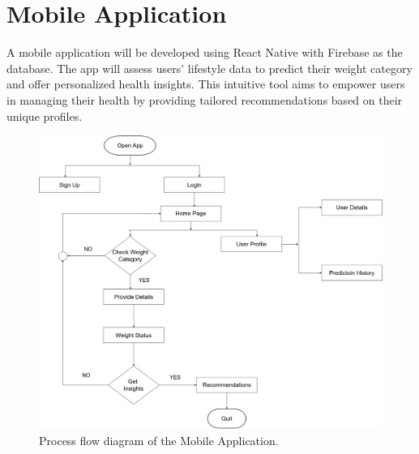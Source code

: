 \section{Mobile Application}

A mobile application will be developed using React Native with Firebase as the database. The app will assess users' lifestyle data to predict their weight category and offer personalized health insights. This intuitive tool aims to empower users in managing their health by providing tailored recommendations based on their unique profiles.

\begin{figure}[H]
    \centering
    \includegraphics[width=1.0\textwidth]{figures/finalapp.drawio.png}
    
    \vspace{7pt} %
    \caption{Process flow diagram of the Mobile Application.}
    \label{Mobile Application}
\end{figure}
